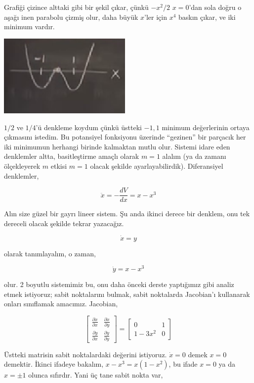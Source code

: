 \documentclass[12pt,fleqn]{article}\usepackage{../../common}
\begin{document}
Grafiği çizince alttaki gibi bir şekil çıkar, çünkü $-x^2/2$ $x=0$'dan sola
doğru o aşağı inen parabolu çizmiş olur, daha büyük $x$'ler için $x^4$ baskın
çıkar, ve iki minimum vardır. 

\includegraphics[height=4cm]{07_01.png}

$1/2$ ve $1/4$'ü denkleme koydum çünkü üstteki $-1,1$ minimum değerlerinin
ortaya çıkmasını istedim. Bu potansiyel fonksiyonu üzerinde ``gezinen'' bir
parçacık her iki minimumun herhangi birinde kalmaktan mutlu olur. Sistemi idare
eden denklemler altta, basitleştirme amaçlı olarak $m=1$ alalım (ya da zamanı
ölçekleyerek $m$ etkisi $m=1$ olacak şekilde ayarlayabilirdik). Diferansiyel
denklemler,

$$ \ddot{x} = -\frac{dV}{dx} = x-x^3 $$

Alın size güzel bir gayrı lineer sistem. Şu anda ikinci derece bir denklem, onu
tek dereceli olacak şekilde tekrar yazacağız.

$$\dot{x} = y$$

olarak tanımlayalım, o zaman,

$$\dot{y} = x - x^3$$

olur. 2 boyutlu sistemimiz bu, onu daha önceki derste yaptığımız gibi analiz
etmek istiyoruz; sabit noktalarını bulmak, sabit noktalarda Jacobian'ı
kullanarak onları sınıflamak amacımız. Jacobian,

$$
\left[\begin{array}{rr}
\frac{\partial \dot{x}}{\partial x} & \frac{\partial \dot{x}}{\partial y} \\
\frac{\partial \dot{y}}{\partial x} & \frac{\partial \dot{y}}{\partial y} 
  \end{array}\right] =
\left[\begin{array}{cc}
0 & 1 \\ 1-3x^2 & 0
\end{array}\right]
$$

Üstteki matrisin sabit noktalardaki değerini istiyoruz. $\dot{x}=0$ demek $x=0$
demektir. İkinci ifadeye bakalım, $x - x^3 = x(1 - x^2)$, bu ifade $x=0$ ya da
$x = \pm 1$ olunca sıfırdır. Yani üç tane sabit nokta var,
\end{document}
